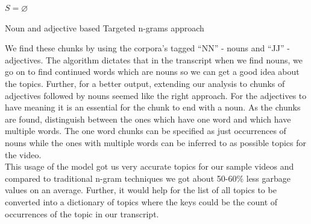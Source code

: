 \documentclass[conference]{IEEEtran}
\let\emptyset\varnothing
\begin{document}
\begin{algorithm}
\SetAlgoLined
\DontPrintSemicolon
{}
	$S = \emptyset$\\

\caption{Noun and adjective based Targeted n-grams approach}
\end{algorithm}


We find these chunks by using the corpora’s tagged “NN” - nouns and “JJ” - adjectives. The algorithm dictates that in the transcript when we find nouns, we go on to find continued words which are nouns so we can get a good idea about the topics. Further, for a better output, extending our analysis to chunks of adjectives followed by nouns seemed like the right approach. For the adjectives to have meaning it is an essential for the chunk to end with a noun. As the chunks are found, distinguish between the ones which have one word and which have multiple words. The one word chunks can be specified as just occurrences of nouns while the ones with multiple words can be inferred to as possible topics for the video.\\
\indent This usage of the model got us very accurate topics for our sample videos and compared to traditional n-gram techniques we got about 50-60\% less garbage values on an average. Further, it would help for the list of all topics to be converted into a dictionary of topics where the keys could be the count of occurrences of the topic in our transcript.
\end{document}

